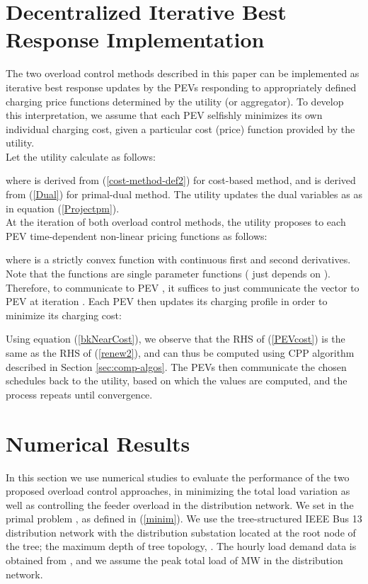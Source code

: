 \documentclass[12pt,draftcls,onecolumn]{IEEEtran}
\begin{document}
\section{Decentralized Iterative Best Response Implementation}\label{BestResponse}
\indent The two overload control methods described in this paper can be implemented as iterative best response updates by the PEVs responding to appropriately defined charging price functions determined by the utility (or aggregator). To develop this interpretation, we assume that each PEV selfishly minimizes its own individual charging cost, given a particular cost (price) function provided by the utility.\\
\indent Let the utility calculate  as follows:

where  is derived from (\ref{cost-method-def2}) for cost-based method, and  is derived from (\ref{Dual}) for primal-dual method. The utility updates the dual variables as  as in equation (\ref{Projectpm}).\\
\indent At the  iteration of both overload control methods, the utility proposes to each PEV  time-dependent non-linear pricing functions  as follows:

where  is a strictly convex function with continuous first and second derivatives. Note that the functions  are single parameter functions ( just depends on ). Therefore, to communicate  to PEV , it suffices to just communicate the vector  to PEV  at iteration . Each PEV  then updates its charging profile in order to minimize its charging cost:

Using equation (\ref{bkNearCost}), we observe that the RHS of (\ref{PEVcost}) is the same as the RHS of (\ref{renew2}), and can thus be computed using CPP algorithm described in Section \ref{sec:comp-algos}. The PEVs then communicate the chosen schedules  back to the utility, based on which the  values are computed, and the process repeats until convergence.
\section{Numerical Results}\label{sec:sim}
\indent In this section we use numerical studies to evaluate the performance of the two proposed overload control approaches, in minimizing the total load variation as well as controlling the feeder overload in the distribution network. We set  in the primal problem , as defined in (\ref{minim}). We use the tree-structured IEEE Bus 13 distribution network \cite{B13} with the distribution substation located at the root node of the tree; the maximum depth of tree topology, . The hourly load demand data is obtained from \cite{AE10}, and we assume the peak total load of  MW in the distribution network.
\end{document}
